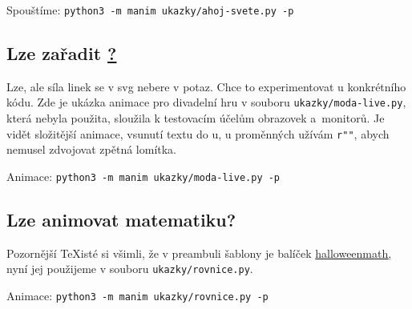 \noindent
\begin{minipage}{\linewidth}

\end{minipage}

Spouštíme: \texttt{python3 -m manim ukazky/ahoj-svete.py -p}
\smallskip

\maldelka=6.7mm
\noindent
{}\hfill
{}\hfill
{}\hfill
{}%


\subsection{Lze zařadit \href{https://www.ctan.org/pkg/pgf}{\maltikz?}}
Lze, ale síla linek se v svg nebere v potaz. Chce to experimentovat u konkrétního kódu. Zde je ukázka animace pro divadelní hru v souboru \texttt{ukazky/moda-live.py}, která nebyla použita, sloužila k testovacím účelům obrazovek a~monitorů. Je vidět složitější animace, vsunutí textu do \maltikz u, u proměnných užívám \texttt{r""}, abych nemusel zdvojovat zpětná lomítka.



Animace: \texttt{python3 -m manim ukazky/moda-live.py -p}
\smallskip

\maldelka=18.5mm
\noindent
{}\hfill
{}%



\subsection{Lze animovat matematiku?}
Pozornější \TeX isté si všimli, že v preambuli šablony je balíček 
\href{https://www.ctan.org/pkg/halloweenmath}{\textsf{halloweenmath},} nyní jej použijeme v souboru \texttt{ukazky/rovnice.py}.



Animace: \texttt{python3 -m manim ukazky/rovnice.py -p}
\smallskip

\maldelka=9.5mm
\noindent
{}\hfill
{}\hfill
{}%


